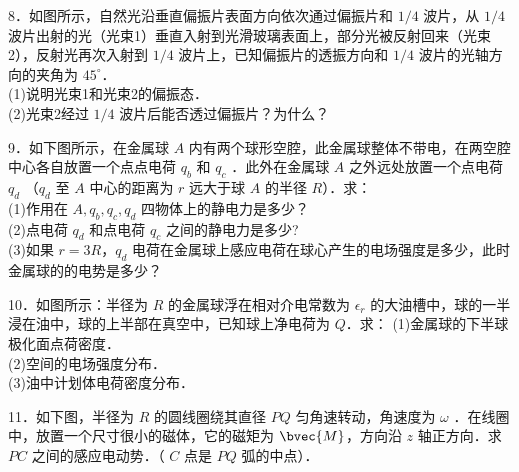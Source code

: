 8．如图所示，自然光沿垂直偏振片表面方向依次通过偏振片和 $1/4$ 波片，从 $1/4$ 波片出射的光（光束1）垂直入射到光滑玻璃表面上，部分光被反射回来（光束2），反射光再次入射到 $1/4$ 波片上，已知偏振片的透振方向和 $1/4$ 波片的光轴方向的夹角为 $45^\circ$．\\
(1)说明光束1和光束2的偏振态．\\
(2)光束2经过 $1/4$ 波片后能否透过偏振片？为什么？

9．如下图所示，在金属球 $A$ 内有两个球形空腔，此金属球整体不带电，在两空腔中心各自放置一个点点电荷 $q_b$ 和 $q_c$ ．此外在金属球 $A$ 之外远处放置一个点电荷 $q_d$ （$q_d$ 至 $A$ 中心的距离为 $r$ 远大于球 $A$ 的半径 $R$）．求：\\
(1)作用在 $A,q_b,q_c,q_d$ 四物体上的静电力是多少？\\
(2)点电荷 $q_d$ 和点电荷 $q_c$ 之间的静电力是多少?\\
(3)如果 $r=3R$，$q_d$ 电荷在金属球上感应电荷在球心产生的电场强度是多少，此时金属球的的电势是多少？

10．如图所示：半径为 $R$ 的金属球浮在相对介电常数为 $\epsilon_r$ 的大油槽中，球的一半浸在油中，球的上半部在真空中，已知球上净电荷为 $Q$．求：
(1)金属球的下半球极化面点荷密度．\\
(2)空间的电场强度分布．\\
(3)油中计划体电荷密度分布．

11．如下图，半径为 $R$ 的圆线圈绕其直径 $PQ$ 匀角速转动，角速度为 $\omega$ ．在线圈中，放置一个尺寸很小的磁体，它的磁矩为 $
\bvec{M}$，方向沿 $z$ 轴正方向．求 $PC$ 之间的感应电动势．（ $C$ 点是 $PQ$ 弧的中点）．